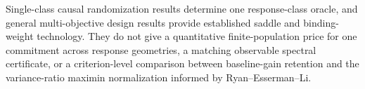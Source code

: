Single-class causal randomization results determine one response-class oracle, and general multi-objective design results provide established saddle and binding-weight technology. They do not give a quantitative finite-population price for one commitment across response geometries, a matching observable spectral certificate, or a criterion-level comparison between baseline-gain retention and the variance-ratio maximin normalization informed by Ryan--Esserman--Li.